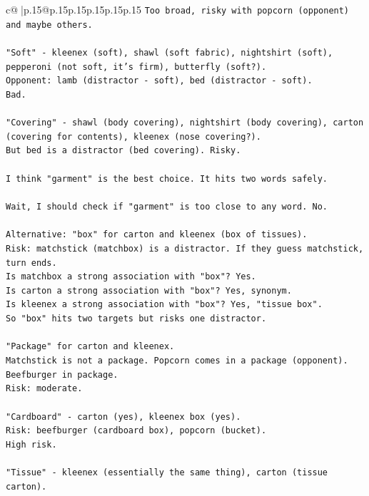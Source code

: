 \documentclass{article}
\begin{document}
{\begin{supertabular}{c@{$\;$}|p{.15\linewidth}@{}p{.15\linewidth}p{.15\linewidth}p{.15\linewidth}p{.15\linewidth}p{.15\linewidth}}
{{{\texttt{Too broad, risky with popcorn (opponent) and maybe others.} \\
\\ 
\texttt{"Soft" {-} kleenex (soft), shawl (soft fabric), nightshirt (soft), pepperoni (not soft, it's firm), butterfly (soft?).} \\
\texttt{Opponent: lamb (distractor {-} soft), bed (distractor {-} soft).} \\
\texttt{Bad.} \\
\\ 
\texttt{"Covering" {-} shawl (body covering), nightshirt (body covering), carton (covering for contents), kleenex (nose covering?).} \\
\texttt{But bed is a distractor (bed covering). Risky.} \\
\\ 
\texttt{I think "garment" is the best choice. It hits two words safely.} \\
\\ 
\texttt{Wait, I should check if "garment" is too close to any word. No.} \\
\\ 
\texttt{Alternative: "box" for carton and kleenex (box of tissues).} \\
\texttt{Risk: matchstick (matchbox) is a distractor. If they guess matchstick, turn ends.} \\
\texttt{Is matchbox a strong association with "box"? Yes.} \\
\texttt{Is carton a strong association with "box"? Yes, synonym.} \\
\texttt{Is kleenex a strong association with "box"? Yes, "tissue box".} \\
\texttt{So "box" hits two targets but risks one distractor.} \\
\\ 
\texttt{"Package" for carton and kleenex.} \\
\texttt{Matchstick is not a package. Popcorn comes in a package (opponent). Beefburger in package.} \\
\texttt{Risk: moderate.} \\
\\ 
\texttt{"Cardboard" {-} carton (yes), kleenex box (yes).} \\
\texttt{Risk: beefburger (cardboard box), popcorn (bucket).} \\
\texttt{High risk.} \\
\\ 
\texttt{"Tissue" {-} kleenex (essentially the same thing), carton (tissue carton).} \\
}}}
\end{supertabular}}
\end{document}
